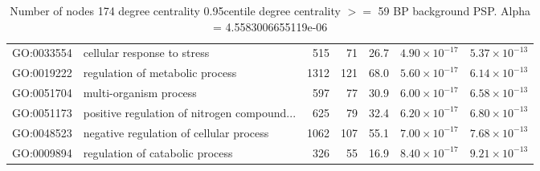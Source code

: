 \begin{table}[ht]
\begin{adjustbox}{max width=\textwidth}
\begin{tabular}{llrrrrr}
  GO:0033554 & cellular response to stress & 515 & 71 & 26.7 & $4.90 \times 10^{-17}$ & $5.37 \times 10^{-13}$ \\ 
  GO:0019222 & regulation of metabolic process & 1312 & 121 & 68.0 & $5.60 \times 10^{-17}$ & $6.14 \times 10^{-13}$ \\ 
  GO:0051704 & multi-organism process & 597 & 77 & 30.9 & $6.00 \times 10^{-17}$ & $6.58 \times 10^{-13}$ \\ 
  GO:0051173 & positive regulation of nitrogen compound... & 625 & 79 & 32.4 & $6.20 \times 10^{-17}$ & $6.80 \times 10^{-13}$ \\ 
  GO:0048523 & negative regulation of cellular process & 1062 & 107 & 55.1 & $7.00 \times 10^{-17}$ & $7.68 \times 10^{-13}$ \\ 
  GO:0009894 & regulation of catabolic process & 326 & 55 & 16.9 & $8.40 \times 10^{-17}$ & $9.21 \times 10^{-13}$ \\ 
   \hline
\end{tabular}
\end{adjustbox}
\caption{Number of nodes 174 degree centrality 0.95centile  degree centrality $>=$ 59 BP background PSP. Alpha = 4.5583006655119e-06} 
\label{tab:Number of nodes 174 degree centrality 0.95centile  degree centrality >= 59 BP background PSP. Alpha = 4.5583006655119e-06}
\end{table}





